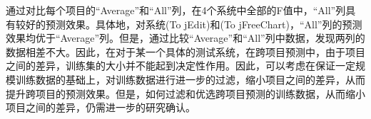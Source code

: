 通过对比每个项目的“Average”和“All”列，在4个系统中全部的F值中，“All”列具有较好的预测效果。具体地，对系统(To jEdit)和(To jFreeChart)，“All”列的预测效果均优于“Average”列。但是，通过比较“Average”和“All”列中数据，发现两列的数据相差不大。因此，在对于某一个具体的测试系统，在跨项目预测中，由于项目之间的差异，训练集的大小并不能起到决定性作用。因此，可以考虑在保证一定规模训练数据的基础上，对训练数据进行进一步的过滤，缩小项目之间的差异，从而提升跨项目的预测效果。但是，如何过滤和优选跨项目预测的训练数据，从而缩小项目之间的差异，仍需进一步的研究确认。

